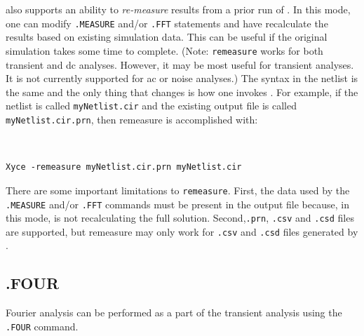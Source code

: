 \Xyce{} also supports an ability to {\it re-measure} results from a prior run of \Xyce{}.
In this mode, one can modify \texttt{.MEASURE} and/or \texttt{.FFT} statements and have
\Xyce{} recalculate  the results based on existing simulation data.  This can be useful if the
original simulation takes some time to complete.  (Note: \texttt{remeasure} works for both
transient and dc analyses.  However, it may be most useful for transient analyses.  It is
not currently supported for ac or noise analyses.)  The syntax in the netlist is the same
and the only thing that changes is how one invokes \Xyce{}.  For example, if the netlist
is called {\tt myNetlist.cir} and the existing output file is called {\tt myNetlist.cir.prn},
then remeasure is accomplished with:
{\tt
\begin{verbatim}
Xyce -remeasure myNetlist.cir.prn myNetlist.cir
\end{verbatim}
}

There are some important limitations to \texttt{remeasure}.  First, the data used by the
\texttt{.MEASURE} and/or \texttt{.FFT} commands must be present in the output file because,
in this mode, \Xyce{} is not recalculating the full solution.  Second,\texttt{.prn},
\texttt{.csv} and \texttt{.csd} files are supported, but remeasure may only
work for \texttt{.csv} and \texttt{.csd} files generated by \Xyce{}.


\subsection{.FOUR}
Fourier analysis can be performed as a part of the transient analysis using
the \texttt{.FOUR} command.


